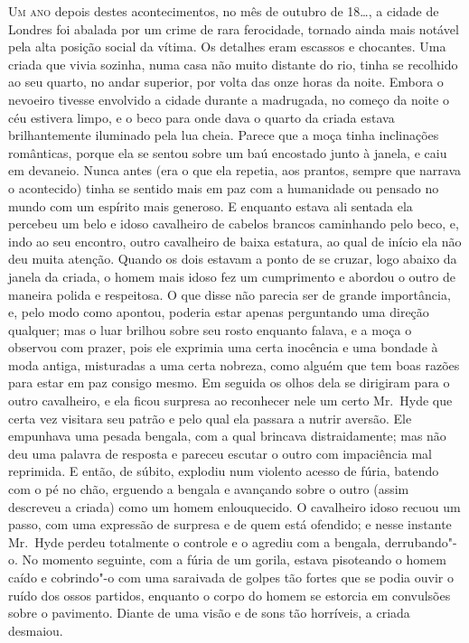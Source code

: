 \textsc{Um ano} depois destes acontecimentos, no mês de outubro de 18\ldots{}, a
cidade de Londres foi abalada por um crime de rara ferocidade, tornado
ainda mais notável pela alta posição social da vítima.  Os detalhes
eram escassos e chocantes.  Uma criada que vivia sozinha, numa casa não
muito distante do rio, tinha se recolhido ao seu quarto, no andar
superior, por volta das onze horas da noite.  Embora o nevoeiro tivesse
envolvido a cidade durante a madrugada, no começo da noite o céu
estivera limpo, e o beco para onde dava o quarto da criada estava
brilhantemente iluminado pela lua cheia.  Parece que a moça tinha
inclinações românticas, porque ela se sentou sobre um baú encostado
junto à janela, e caiu em devaneio.  Nunca antes (era o que ela
repetia, aos prantos, sempre que narrava o acontecido) tinha se sentido
mais em paz com a humanidade ou pensado no mundo com um espírito mais
generoso.  E enquanto estava ali sentada ela percebeu um belo e idoso
cavalheiro de cabelos brancos caminhando pelo beco, e, indo ao seu
encontro, outro cavalheiro de baixa estatura, ao qual de início ela não
deu muita atenção.  Quando os dois estavam a ponto de se cruzar, logo
abaixo da janela da criada, o homem mais idoso fez um cumprimento e
abordou o outro de maneira polida e respeitosa.  O que disse não
parecia ser de grande importância, e, pelo modo como apontou, poderia
estar apenas perguntando uma direção qualquer; mas o luar brilhou sobre
seu rosto enquanto falava, e a moça o observou com prazer, pois ele
exprimia uma certa inocência e uma bondade à moda antiga, misturadas a
uma certa nobreza, como alguém que tem boas razões para estar em paz
consigo mesmo.  Em seguida os olhos dela se dirigiram para o outro
cavalheiro, e ela ficou surpresa ao reconhecer nele um certo Mr.~Hyde
que certa vez visitara seu patrão e pelo qual ela passara a nutrir
aversão.  Ele empunhava uma pesada bengala, com a qual brincava
distraidamente; mas não deu uma palavra de resposta e pareceu escutar o
outro com impaciência mal reprimida.  E então, de súbito, explodiu num
violento acesso de fúria, batendo com o pé no chão, erguendo a bengala
e avançando sobre o outro (assim descreveu a criada) como um homem
enlouquecido.  O cavalheiro idoso recuou um passo, com uma expressão de
surpresa e de quem está ofendido; e nesse instante Mr.~Hyde perdeu
totalmente o controle e o agrediu com a bengala, derrubando"-o.  No
momento seguinte, com a fúria de um gorila, estava pisoteando o homem
caído e cobrindo"-o com uma saraivada de golpes tão fortes que se podia
ouvir o ruído dos ossos partidos, enquanto o corpo do homem se estorcia em
convulsões sobre o pavimento.  Diante de uma visão e de sons tão
horríveis, a criada desmaiou.

